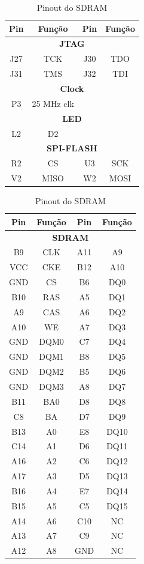 \documentclass{report}
\begin{document}
\begin{table}[H]
\centering
\begin{minipage}{0.45\textwidth}
\centering
\begin{tabular}{|c|c|c|c|}
\hline
\textbf{Pin} & \textbf{Função} & \textbf{Pin} & \textbf{Função} \\
\hline
\multicolumn{4}{|c|}{\textbf{JTAG}} \\
\hline
J27 & TCK  & J30 & TDO \\
J31 & TMS  & J32 & TDI \\
\hline
\multicolumn{4}{|c|}{\textbf{Clock}} \\
\hline
P3 & 25 MHz clk & & \\
\hline
\multicolumn{4}{|c|}{\textbf{LED}} \\
\hline
L2 & D2 & & \\
\hline
\multicolumn{4}{|c|}{\textbf{SPI-FLASH}} \\
\hline
R2 & CS   & U3 & SCK  \\
V2 & MISO & W2 & MOSI \\
\hline
\end{tabular}
\caption{Pinout para JTAG, Clock, LED e SPI-FLASH}
\label{tab:jtag_clock_led_spi}
\end{minipage}%
\hfill
\begin{minipage}{0.45\textwidth}
\centering
\begin{tabular}{|c|c|c|c|}
\hline
\textbf{Pin} & \textbf{Função} & \textbf{Pin} & \textbf{Função} \\
\hline
\multicolumn{4}{|c|}{\textbf{SDRAM}} \\
\hline
B9  & CLK  & A11 & A9   \\
VCC & CKE  & B12 & A10  \\
GND & CS   & B6  & DQ0  \\
B10 & RAS  & A5  & DQ1  \\
A9  & CAS  & A6  & DQ2  \\
A10 & WE   & A7  & DQ3  \\
GND & DQM0 & C7  & DQ4  \\
GND & DQM1 & B8  & DQ5  \\
GND & DQM2 & B5  & DQ6  \\
GND & DQM3 & A8  & DQ7  \\
B11 & BA0  & D8  & DQ8  \\
C8  & BA   & D7  & DQ9  \\
B13 & A0   & E8  & DQ10 \\
C14 & A1   & D6  & DQ11 \\
A16 & A2   & C6  & DQ12 \\
A17 & A3   & D5  & DQ13 \\
B16 & A4   & E7  & DQ14 \\
B15 & A5   & C5  & DQ15 \\
A14 & A6   & C10 & NC   \\
A13 & A7   & C9  & NC   \\
A12 & A8   & GND & NC   \\
\hline
\end{tabular}
\caption{Pinout do SDRAM}
\label{tab:sdram}
\end{minipage}
\end{table}
\end{document}
